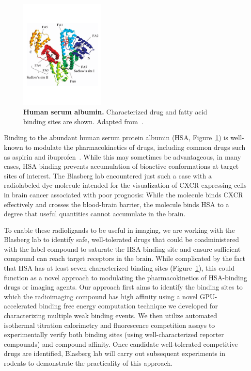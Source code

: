 \documentclass[10pt]{article}
\begin{document}
\begin{figure}
\vspace{-2.3cm}
\includegraphics[width=0.38\textwidth]{figures/hsa-binding-sites.pdf}
\vspace{-2.5cm}
\caption{\footnotesize \label{figure:hsa} {\bf Human serum albumin.}
Characterized drug and fatty acid binding sites are shown.
Adapted from~\cite{fasano:iubmb-life:2005:hsa-review}.}
\end{figure}

Binding to the abundant human serum protein albumin (HSA, Figure~\ref{figure:hsa}) is well-known to modulate the pharmacokinetics of drugs, including common drugs such as aspirin and ibuprofen~\cite{fasano:iubmb-life:2005:hsa-review}.
While this may sometimes be advantageous, in many cases, HSA binding prevents accumulation of bioactive conformations at target sites of interest.
The Blasberg lab encountered just such a case with a radiolabeled dye molecule intended for the visualization of CXCR-expressing cells in brain cancer associated with poor prognosis: While the molecule binds CXCR effectively and crosses the blood-brain barrier, the molecule binds HSA to a degree that useful quantities cannot accumulate in the brain.

To enable these radioligands to be useful in imaging, we are working with the Blasberg lab to identify safe, well-tolerated drugs that could be coadministered with the label compound to saturate the HSA binding site and ensure sufficient compound can reach target receptors in the brain.
While complicated by the fact that HSA has at least seven characterized binding sites (Figure~\ref{figure:hsa}), this could function as a novel approach to modulating the pharmacokinetics of HSA-binding drugs or imaging agents.
Our approach first aims to identify the binding sites to which the radioimaging compound has high affinity using a novel GPU-accelerated binding free energy computation technique we developed for characterizing multiple weak binding events.
We then utilize automated isothermal titration calorimetry and fluorescence competition assays to experimentally verify both binding sites (using well-characterized reporter compounds) and compound affinity.
Once candidate well-tolerated competitive drugs are identified, Blasberg lab will carry out subsequent experiments in rodents to demonstrate the practicality of this approach.
\end{document}
